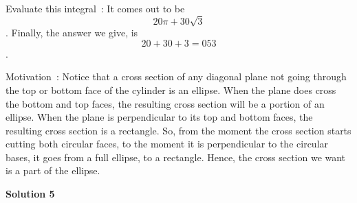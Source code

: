 \begin{enumerate}
 
Evaluate this integral : It comes out to be 
 \[20\pi + 30\sqrt{3}\]. Finally, the answer we give, is 
 \[20 + 30 + 3 = \boxed{053}\].

 Motivation : Notice that a cross section of any diagonal plane not going through the top or bottom face of the cylinder is an ellipse. When the plane does cross the bottom and top faces, the resulting cross section will be a portion of an ellipse. When the plane is perpendicular to its top and bottom faces, the resulting cross section is a rectangle. So, from the moment the cross section starts cutting both circular faces, to the moment it is perpendicular to the circular bases, it goes from a full ellipse, to a rectangle. Hence, the cross section we want is a part of the ellipse.

 



\textbf{Solution 5}


\end{enumerate}

